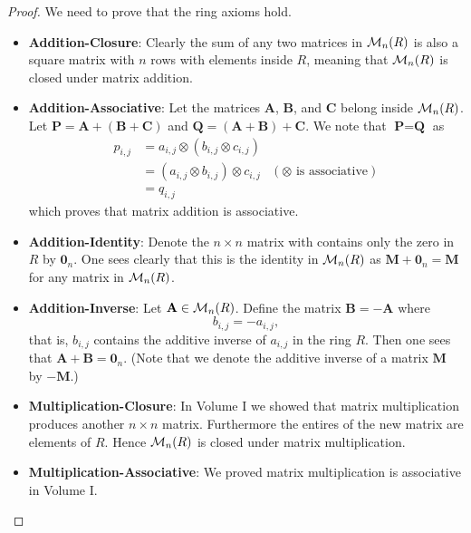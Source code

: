 \begin{proof}
    We need to prove that the ring axioms hold.
    \begin{itemize}
        \item \textbf{Addition-Closure}: Clearly the sum of any two matrices in $\mathcal{M}_{n}(R)$ is also a square matrix with $n$ rows with elements inside $R$, meaning that $\mathcal{M}_{n}(R)$ is closed under matrix addition.

        \item \textbf{Addition-Associative}: Let the matrices $\textbf{A}$, $\textbf{B}$, and $\textbf{C}$ belong inside $\mathcal{M}_{n}(R)$. Let $\textbf{P} = \textbf{A} + (\textbf{B} + \textbf{C})$ and $\textbf{Q} = (\textbf{A} + \textbf{B}) + \textbf{C}$. We note that $\textbf{P} = \textbf{Q}$ as
        \begin{align*}
            p_{i,j} &= a_{i,j} \otimes (b_{i,j} \otimes c_{i,j})\\
            &= (a_{i,j} \otimes b_{i,j}) \otimes c_{i,j} & (\otimes\text{ is associative})\\
            &= q_{i,j}
        \end{align*}
        which proves that matrix addition is associative.

        \item \textbf{Addition-Identity}: Denote the $n \times n$ matrix with contains only the zero in $R$ by $\textbf{0}_n$. One sees clearly that this is the identity in $\mathcal{M}_{n}(R)$ as $\textbf{M} + \textbf{0}_n = \textbf{M}$ for any matrix in $\mathcal{M}_{n}(R)$.
        
        \item \textbf{Addition-Inverse}: Let $\textbf{A} \in \mathcal{M}_{n}(R)$. Define the matrix $\textbf{B} = -\textbf{A}$ where
        \[
            b_{i,j} = -a_{i,j},    
        \]
        that is, $b_{i,j}$ contains the additive inverse of $a_{i,j}$ in the ring $R$. Then one sees that $\textbf{A} + \textbf{B} = \textbf{0}_n$.\newline
        (Note that we denote the additive inverse of a matrix $\textbf{M}$ by $-\textbf{M}$.)

        \item \textbf{Multiplication-Closure}: In Volume I we showed that matrix multiplication produces another $n \times n$ matrix. Furthermore the entires of the new matrix are elements of $R$. Hence $\mathcal{M}_{n}(R)$ is closed under matrix multiplication.
        
        \item \textbf{Multiplication-Associative}: We proved matrix multiplication is associative in Volume I.
        

\end{itemize}
\end{proof}
